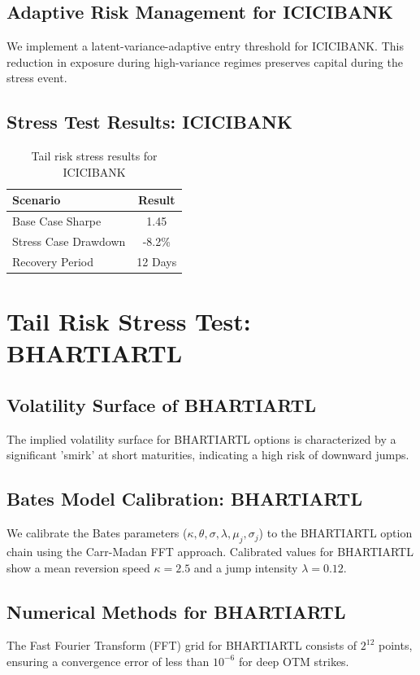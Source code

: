 \documentclass[12pt,a4paper,twoside]{article}
\begin{document}
\subsection{Adaptive Risk Management for ICICIBANK}
We implement a latent-variance-adaptive entry threshold for ICICIBANK. This reduction in exposure during high-variance regimes preserves capital during the stress event.
\subsection{Stress Test Results: ICICIBANK}
\begin{table}[H]
\centering
\begin{tabular}{|l|c|}
\hline
Scenario & Result \\
\hline
Base Case Sharpe & 1.45 \\
Stress Case Drawdown & -8.2\% \\
Recovery Period & 12 Days \\
\hline
\end{tabular}
\caption{Tail risk stress results for ICICIBANK}
\end{table}
\newpage

\section{Tail Risk Stress Test: BHARTIARTL}
\subsection{Volatility Surface of BHARTIARTL}
The implied volatility surface for BHARTIARTL options is characterized by a significant 'smirk' at short maturities, indicating a high risk of downward jumps.
\subsection{Bates Model Calibration: BHARTIARTL}
We calibrate the Bates parameters ($\kappa, \theta, \sigma, \lambda, \mu_j, \sigma_j$) to the BHARTIARTL option chain using the Carr-Madan FFT approach.
Calibrated values for BHARTIARTL show a mean reversion speed $\kappa = 2.5$ and a jump intensity $\lambda = 0.12$.
\subsection{Numerical Methods for BHARTIARTL}
The Fast Fourier Transform (FFT) grid for BHARTIARTL consists of $2^{12}$ points, ensuring a convergence error of less than $10^{-6}$ for deep OTM strikes.
\end{document}
